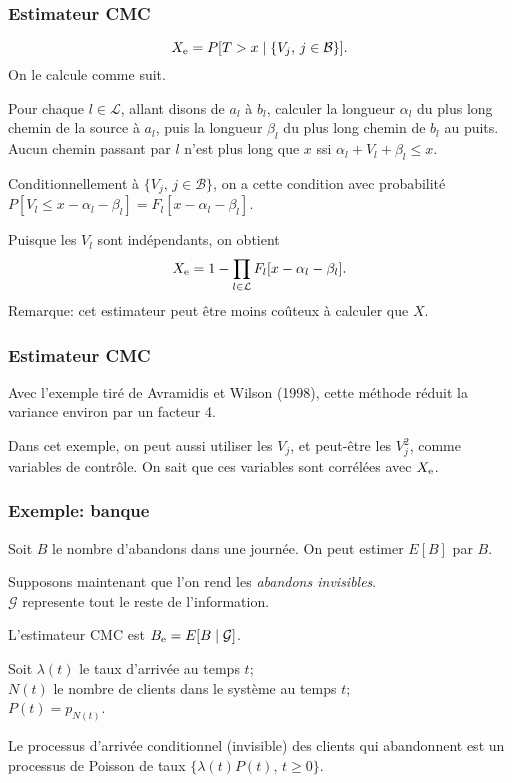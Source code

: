\documentclass[t,usepdftitle=false]{beamer}
\def\cB{\mathcal{B}}
\def\cG{\mathcal{G}}
\def\cL{\mathcal{L}}
\def\yel{}
\def\rme{{\rm e}}
\begin{document}
\begin{frame}
	\frametitle{Estimateur CMC}
	
	\[
	\yel{X_\rme} = P[T > x\mid \{V_j,\, j \in\cB\}].
	\]
	On le calcule comme suit.
	
	Pour chaque $\yel{l}\in\cL$, allant disons de $\yel{a_l}$ \`a $\yel{b_l}$,
	calculer la longueur $\yel{\alpha_l}$ du plus long chemin de la source 
	\`a $a_l$,
	puis la longueur $\yel{\beta_l}$ du plus long chemin de $b_l$ au puits.
	Aucun chemin passant par $l$ n'est plus long que $x$ ssi
	$\alpha_l + V_l + \beta_l \le x$.
	
	
	Conditionnellement \`a $\{V_j,\, j \in\cB\}$, on a cette condition 
	avec probabilit\'e $P[V_l \le x - \alpha_l - \beta_l] 
	= F_l[x - \alpha_l - \beta_l]$.
	
	
	Puisque les $V_l$ sont ind\'ependants, on obtient
	\[
	\yel{X_\rme} = 1 - \prod_{l\in\cL} F_l[x - \alpha_l - \beta_l].
	\]
	Remarque: cet estimateur peut \^etre moins co\^uteux \`a calculer que $X$.

\end{frame}


\begin{frame}
\frametitle{Estimateur CMC}
	
	Avec l'exemple tir\'e de Avramidis et Wilson (1998), cette m\'ethode
	r\'eduit la variance environ par un facteur 4.
	
	
	Dans cet exemple, on peut aussi utiliser les $V_j$, et peut-\^etre
	les $V_j^2$, comme variables de contr\^ole. 
	On sait que ces variables sont corr\'el\'ees avec $X_\rme$.
	
\end{frame}


\begin{frame}
	\frametitle{Exemple: banque}
	
	
	Soit $\yel{B}$ le nombre d'abandons dans une journ\'ee.
	On peut estimer $E[B]$ par $B$.
	
	
	Supposons maintenant que l'on rend les \emph{abandons invisibles}.\\
	$\yel{\cG}$ represente tout le reste de l'information.
	
	\mbox{}
	
	L'estimateur CMC est $B_{\rme} = E[B \mid \cG]$.
	
	
	Soit $\yel{\lambda(t)}$ le taux d'arriv\'ee au temps $t$;\\
	$\yel{N(t)}$ le nombre de clients dans le syst\`eme au temps $t$;\\
	$\yel{P(t)} = p_{N(t)}$.
	
	
	Le processus d'arriv\'ee conditionnel (invisible) des clients qui 
	abandonnent est un processus de Poisson de taux 
	$\{\lambda(t) P(t),\, t\ge 0\}$. 
	
\end{frame}
\end{document}
